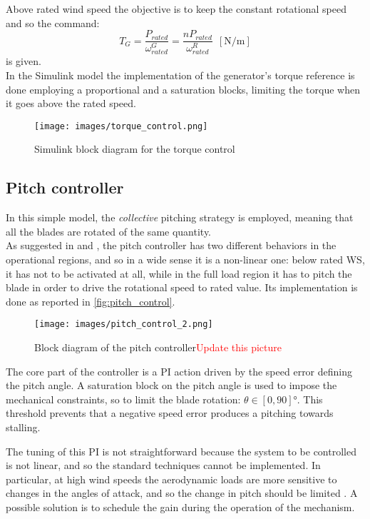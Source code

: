 Above rated wind speed the objective is to keep the constant rotational speed and so the command:
\begin{equation}
    T_G = \frac{P_{rated}}{\omega_{rated}^G} = \frac{nP_{rated}}{\omega_{rated}^R}\ \ \left[\si{\newton\per\meter}\right]
    \label{eq:T_G3}
\end{equation}
is given.\\
In the Simulink model the implementation of the generator's torque reference is done employing a proportional and a saturation blocks, limiting the torque when it goes above the rated speed.
\begin{figure}[htb]
    \centering
    \texttt{[image: images/torque\_control.png]}
    \caption{Simulink block diagram for the torque control}
    \label{fig:torque_control}
\end{figure}

\subsection{Pitch controller}
In this simple model, the \textit{collective} pitching strategy is employed, meaning that all the blades are rotated of the same quantity.\\
As suggested in \cite{Aerodynamics_of_wind_turbines} and \cite{SMILDEN2016386}, the pitch controller has two different behaviors in the operational regions, and so in a wide sense it is a non-linear one: below rated \acrshort{WS}, it has not to be activated at all, while in the full load region it has to pitch the blade in order to drive the rotational speed to rated value. Its implementation is done as reported in \autoref{fig:pitch_control}.
\begin{figure}[htb]
    \centering
    \texttt{[image: images/pitch\_control\_2.png]}
    \caption{Block diagram of the pitch controller\textcolor{red}{Update this picture}}
    \label{fig:pitch_control}
\end{figure}

The core part of the controller is a \acrfull{PI} action driven by the speed error defining the pitch angle. A saturation block on the pitch angle is used to impose the mechanical constraints, so to limit the blade rotation: $\theta \in \left[0, 90\right] \si{\degree}$. This threshold prevents that a negative speed error produces a pitching towards stalling.

The tuning of this PI is not straightforward because the system to be controlled is not linear, and so the standard techniques cannot be implemented. In particular, at high wind speeds the aerodynamic loads are more sensitive to changes in the angles of attack, and so the change in pitch should be limited \cite{Aerodynamics_of_wind_turbines}. A possible solution is to schedule the gain during the operation of the mechanism.

